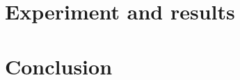 \documentclass[num-refs]{wiley-article}
\begin{document}



\section{Experiment and results}
\label{sec:experiments}

\section{Conclusion}
\label{sec:conclusion}


% 



\end{document}
